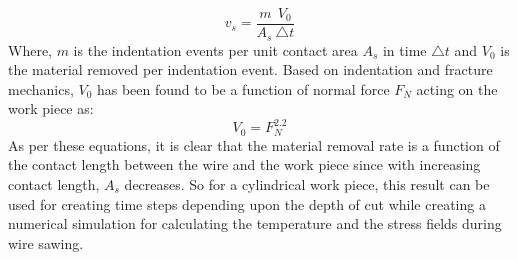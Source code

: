 \begin{equation}
v_{s} =  \frac{m \ \ V_{0}}{A_{s} \  \triangle t}
\label {cr-slip2}
\end{equation}
\newline
Where, $m$ is the indentation events per unit contact area $A_{s}$ in time $\triangle t$ and $V_{0}$ is the material removed per indentation event. Based on indentation and fracture mechanics, $V_{0}$ has been found to be a function of normal force $F_{N}$ acting on the work piece as:
\begin{equation}
V_{0} = F^{2.2}_{N}
\label {cr-slip3}
\end{equation}
\newline
As per these equations, it is clear that the material removal rate is a function of the contact length between the wire and the work piece since with increasing contact length, $A_{s}$ decreases. So for a cylindrical work piece, this result can be used for creating time steps depending upon the depth of cut while creating a numerical simulation for calculating the temperature and the stress fields during wire sawing.


